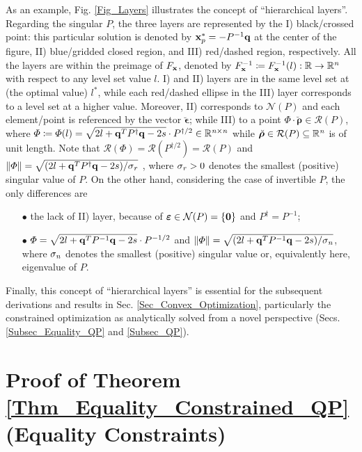 \documentclass{imaman}
\newcommand{\bfx}{{\bf x}}
\newcommand{\bfq}{{\bf q}}
\newcommand{\bfepsilon}{{\boldsymbol \epsilon}}
\newcommand{\bfrho}{{\boldsymbol \rho}}
\newcommand{\bfvarepsilon}{{\boldsymbol \varepsilon}}
\newcommand{\bfzero}{{\bf 0}}
\newcommand{\real}{\mathbb{R}}
\newcommand{\calN}{{\mathcal N}}
\newcommand{\calR}{{\mathcal R}}
\newcommand{\itn}{{\it n}}
\newcommand{\itr}{{\it r}}
\numberwithin{equation}{section}
\begin{document}
\begin{remark}
As an example, Fig. \ref{Fig_Layers} illustrates the concept of ``hierarchical layers''. Regarding the singular $P$, the three layers are represented by the I) black/crossed point: this particular solution is denoted by $\bfx_p^*=-P^{-1}\bfq$ at the center of the figure, II) blue/gridded closed region, and III) red/dashed region, respectively. All the layers are within the preimage of $F_\bfx$, denoted by $F_\bfx^{-1}\coloneqq F_\bfx^{-1}(l):\real\rightarrow\real^\itn$ with respect to any level set value $l$. I) and II) layers are in the same level set at (the optimal value) $l^*$, while each red/dashed ellipse in the III) layer corresponds to a level set at a higher value. Moreover, II) corresponds to $\calN(P)$ and each element/point is referenced by the vector $\breve\bfepsilon$; while III) to a point $\Phi\cdot\breve\bfrho\in\calR(P)$, where $\Phi\coloneqq\Phi(l)=\sqrt{2l+\bfq^TP^\dagger\bfq-2s}\cdot P^{\dagger/2}\in\real^{\itn\times\itn}$ while $\breve\bfrho\in\calR(P)\subseteq\real^\itn$ is of unit length. Note that $\calR(\Phi)=\calR(P^{\dagger/2})=\calR(P)$ and $\Vert\Phi\Vert=\sqrt{(2l+\bfq^TP^\dagger\bfq-2s)/\sigma_\itr}$ \citep{GoVa:13}, where $\sigma_\itr>0$ denotes the smallest (positive) singular value of $P$. On the other hand, considering the case of invertible $P$, the only differences are
\begin{enumerate}
\item[$\bullet$] the lack of II) layer, because of $\bfvarepsilon\in\calN(P)=\{\bfzero\}$ and $P^\dagger=P^{-1}$;
\item[$\bullet$] $\Phi=\sqrt{2l+\bfq^TP^{-1}\bfq-2s}\cdot P^{-1/2}$ and $\Vert\Phi\Vert=\sqrt{(2l+\bfq^TP^{-1}\bfq-2s)/\sigma_\itn}$, where $\sigma_\itn$ denotes the smallest (positive) singular value or, equivalently here, eigenvalue of $P$.
\end{enumerate}
Finally, this concept of ``hierarchical layers'' is essential for the subsequent derivations and results in Sec. \ref{Sec_Convex_Optimization}, particularly the constrained optimization as analytically solved from a novel perspective (Secs. \ref{Subsec_Equality_QP} and \ref{Subsec_QP}).
\label{Rem_Fig_Geometric_Layers}
\end{remark}

\section{Proof of Theorem \ref{Thm_Equality_Constrained_QP} (Equality Constraints)}
\label{App_Proof_Equality_Constrained_QP}
\end{document}
